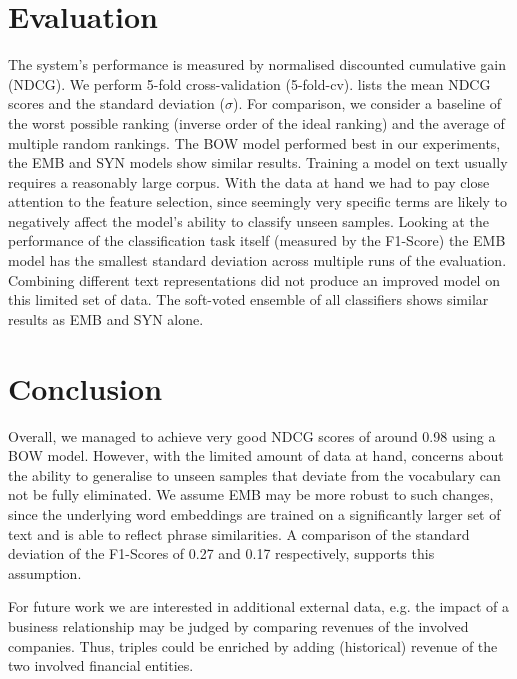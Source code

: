 \section{Evaluation}
The system's performance is measured by normalised discounted cumulative gain (NDCG)\cite{ir}.
We perform 5-fold cross-validation (5-fold-cv).
 lists the mean NDCG scores and the standard deviation ($\sigma$).
For comparison, we consider a baseline of the worst possible ranking (inverse order of the ideal ranking) and the average of multiple random rankings.
The BOW model performed best in our experiments, the EMB and SYN models show similar results. 
Training a model on text usually requires a reasonably large corpus.
With the data at hand we had to pay close attention to the feature selection, since seemingly very specific terms are likely to negatively affect the model's ability to classify unseen samples.
Looking at the performance of the classification task itself (measured by the F1-Score) the EMB model has the smallest standard deviation across multiple runs of the evaluation.
Combining different text representations did not produce an improved model on this limited set of data.
The soft-voted ensemble of all classifiers shows similar results as EMB and SYN alone.

\section{Conclusion}
Overall, we managed to achieve very good NDCG scores of around 0.98 using a BOW model.
However, with the limited amount of data at hand, concerns about the ability to generalise to unseen samples that deviate from the vocabulary can not be fully eliminated.
We assume EMB may be more robust to such changes, since the underlying word embeddings are trained on a significantly larger set of text and is able to reflect phrase similarities.
A comparison of the standard deviation of the F1-Scores of 0.27 and 0.17 respectively, supports this assumption.

For future work we are interested in additional external data, e.g. the impact of a business relationship may be judged by comparing revenues of the involved companies.
Thus, triples could be enriched by adding (historical) revenue of the two involved financial entities. 



%



